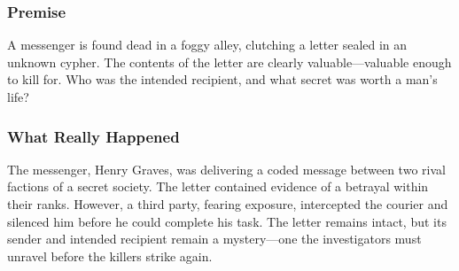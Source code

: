 \subsubsection{Premise} 
A messenger is found dead in a foggy alley, clutching a letter sealed in an unknown cypher. The contents of the letter are clearly valuable—valuable enough to kill for. Who was the intended recipient, and what secret was worth a man’s life?

\subsubsection{What Really Happened} 
The messenger, Henry Graves, was delivering a coded message between two rival factions of a secret society. The letter contained evidence of a betrayal within their ranks. However, a third party, fearing exposure, intercepted the courier and silenced him before he could complete his task. The letter remains intact, but its sender and intended recipient remain a mystery—one the investigators must unravel before the killers strike again.

